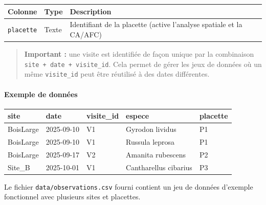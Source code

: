 {\def\LTcaptype{none} %
\begin{longtable}[]{@{}
  >{\raggedright\arraybackslash}p{}
  >{\raggedright\arraybackslash}p{}
  >{\raggedright\arraybackslash}p{}@{}}
\toprule\noalign{}
\begin{minipage}[b]{\linewidth}\raggedright
Colonne
\end{minipage} & \begin{minipage}[b]{\linewidth}\raggedright
Type
\end{minipage} & \begin{minipage}[b]{\linewidth}\raggedright
Description
\end{minipage} \\
\midrule\noalign{}
\endhead
\bottomrule\noalign{}
\endlastfoot
\texttt{placette} & Texte & Identifiant de la placette (active l'analyse
spatiale et la CA/AFC) \\
\end{longtable}
}

\begin{quote}
\textbf{Important :} une visite est identifiée de façon unique par la
combinaison \texttt{site\ +\ date\ +\ visite\_id}. Cela permet de gérer
les jeux de données où un même \texttt{visite\_id} peut être réutilisé à
des dates différentes.
\end{quote}

\paragraph{Exemple de données}\label{exemple-de-donnuxe9es}

{\def\LTcaptype{none} %
\begin{longtable}[]{@{}lllll@{}}
\toprule\noalign{}
site & date & visite\_id & espece & placette \\
\midrule\noalign{}
\endhead
\bottomrule\noalign{}
\endlastfoot
BoisLarge & 2025-09-10 & V1 & Gyrodon lividus & P1 \\
BoisLarge & 2025-09-10 & V1 & Russula leprosa & P1 \\
BoisLarge & 2025-09-17 & V2 & Amanita rubescens & P2 \\
Site\_B & 2025-10-01 & V1 & Cantharellus cibarius & P3 \\
\end{longtable}
}

Le fichier \texttt{data/observations.csv} fourni contient un jeu de
données d'exemple fonctionnel avec plusieurs sites et placettes.

